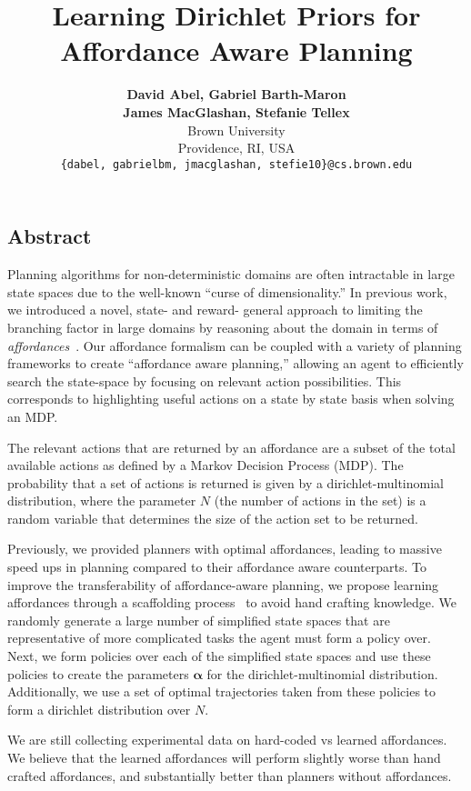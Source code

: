 \documentclass[]{article}
\title{\textbf{Learning Dirichlet Priors for \\Affordance Aware Planning}}
\begin{document}
\author{
\textbf{David Abel, Gabriel Barth-Maron} \\ \textbf{James MacGlashan, Stefanie Tellex} \\
Brown University \\
Providence, RI, USA \\
\texttt{\{dabel, gabrielbm, jmacglashan, stefie10\}@cs.brown.edu}}

\date{}
\maketitle

\begin{center}
\section*{Abstract}
\end{center}
Planning algorithms for non-deterministic domains are often
intractable in large state spaces due to the well-known ``curse of
dimensionality.'' In previous work, we introduced a novel, state- and reward- general approach to limiting the
branching factor in large domains by reasoning about the
domain in terms of {\em affordances}~\citep{gibson77}.  Our affordance
formalism can be coupled with a variety of planning frameworks to
create ``affordance aware planning,'' allowing an agent to efficiently
search the state-space by focusing on relevant action possibilities. This corresponds
to highlighting useful actions on a state by state basis when solving an MDP.

The relevant actions that are returned by an affordance are a subset of
the total available actions as defined by a Markov Decision Process (MDP). The probability
that a set of actions is returned is given by a dirichlet-multinomial distribution, where the parameter
$N$ (the number of actions in the set) is a random variable that determines the size of the action set to be returned.

Previously, we provided planners with optimal affordances, leading to massive
speed ups in planning compared to their affordance aware counterparts.  To improve 
the transferability of affordance-aware planning, we propose learning affordances through 
a scaffolding process~\citep{bruner76} to avoid hand crafting knowledge. We randomly generate a large number of 
simplified state spaces that are representative of more complicated tasks the agent must form a policy over.
Next, we form policies over each of the simplified state spaces and use these policies to create the 
parameters $\boldsymbol{\alpha}$ for the  dirichlet-multinomial distribution.
Additionally, we use a set of optimal trajectories taken from these policies to form a dirichlet distribution over $N$.

We are still collecting experimental data on hard-coded vs learned affordances. We believe that the learned
affordances will perform slightly worse than hand crafted affordances, and substantially better than planners
without affordances. 

{\small

  
}
\end{document}
